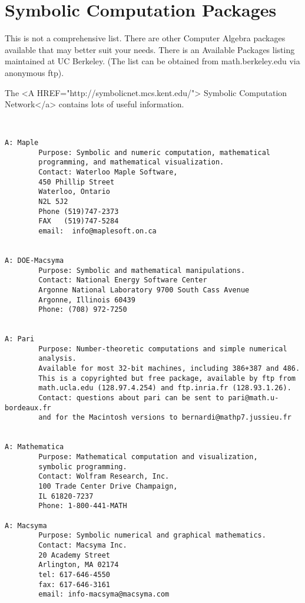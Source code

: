 \section{Symbolic Computation Packages}

    This is not a comprehensive list. There are other Computer Algebra
    packages available that may better suit your needs. There is an
    Available Packages listing maintained at UC Berkeley.  (The list
    can be obtained from math.berkeley.edu via anonymous ftp).

    The  <A HREF="http://symbolicnet.mcs.kent.edu/">
    Symbolic Computation Network</a> contains lots of useful information.




\begin{verbatim}


A: Maple
        Purpose: Symbolic and numeric computation, mathematical
        programming, and mathematical visualization.
        Contact: Waterloo Maple Software,
        450 Phillip Street
        Waterloo, Ontario
        N2L 5J2
        Phone (519)747-2373
        FAX   (519)747-5284
        email:  info@maplesoft.on.ca


A: DOE-Macsyma
        Purpose: Symbolic and mathematical manipulations.
        Contact: National Energy Software Center
        Argonne National Laboratory 9700 South Cass Avenue
        Argonne, Illinois 60439
        Phone: (708) 972-7250


A: Pari
        Purpose: Number-theoretic computations and simple numerical
        analysis.
        Available for most 32-bit machines, including 386+387 and 486.
        This is a copyrighted but free package, available by ftp from
        math.ucla.edu (128.97.4.254) and ftp.inria.fr (128.93.1.26).
        Contact: questions about pari can be sent to pari@math.u-bordeaux.fr
        and for the Macintosh versions to bernardi@mathp7.jussieu.fr


A: Mathematica
        Purpose: Mathematical computation and visualization,
        symbolic programming.
        Contact: Wolfram Research, Inc.
        100 Trade Center Drive Champaign,
        IL 61820-7237
        Phone: 1-800-441-MATH

A: Macsyma
        Purpose: Symbolic numerical and graphical mathematics.
        Contact: Macsyma Inc.
        20 Academy Street
        Arlington, MA 02174
        tel: 617-646-4550
        fax: 617-646-3161
        email: info-macsyma@macsyma.com



\end{verbatim}
